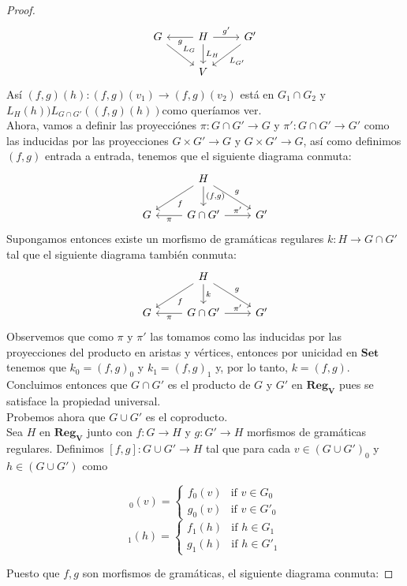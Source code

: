 \documentclass[../main.tex]{subfiles}
\begin{document}
\begin{proof}
 	\[
 	\begin{tikzcd}
 		G \arrow{rd}{L_G} & H \arrow{r}{g'} \arrow{l}{g} \arrow{d}{L_H}  & G' \arrow{ld}{L_{G'}} \\
 		& V 
 	\end{tikzcd}
 	\]
 	Así $(f,g)(h):(f,g)(v_1) \to (f,g)(v_2)$ está en $G_1 \cap G_2$ y $L_H(h))L_{G\cap G'}((f,g)(h))$como queríamos ver. \\
 	Ahora, vamos a definir las proyecciónes $\pi : G\cap G' \to G$ y $\pi' : G\cap G' \to G'$ como las inducidas por las proyecciones $G \times G' \to G$ y $G \times G' \to G$, así como definimos $(f,g)$ entrada a entrada, tenemos que el siguiente diagrama conmuta: 
 	 \[
 	\begin{tikzcd} 		
 		& H \arrow{d}{(f,g)} \arrow{ld}{f} \arrow{rd}{g} & \\
 		G  & G\cap G' \arrow{l}{\pi} \arrow{r}{\pi'} & G'
 	\end{tikzcd}
 	\]
 	Supongamos entonces existe un morfismo de gramáticas regulares $k: H \to G\cap G'$ tal que el siguiente diagrama también conmuta: 
 	 \[
	\begin{tikzcd} 		
		& H \arrow{d}{k} \arrow{ld}{f} \arrow{rd}{g} & \\
		G  & G\cap G' \arrow{l}{\pi} \arrow{r}{\pi'} & G'
	\end{tikzcd}
	\]
	Observemos que como $\pi$ y $\pi'$ las tomamos como las inducidas por las proyecciones del producto en aristas y vértices, entonces por unicidad en $\mathbf{Set}$ tenemos que $k_0=(f,g)_0$ y $k_1=(f,g)_1$ y, por lo tanto, $k=(f,g)$. \\
	Concluimos entonces que $G \cap G'$ es el producto de $G$ y $G'$ en $\mathbf{Reg_V}$ pues se satisface la propiedad universal. \\
	Probemos ahora que $G\cup G'$ es el coproducto. \\
	Sea $H$ en $\mathbf{Reg_V}$ junto con $f:G \to H$ y $g:G' \to H$ morfismos de gramáticas regulares. Definimos $[f,g]:G\cup G' \to H$ tal que para cada $v \in (G\cup G')_0$ y $h \in (G\cup G')$ como
	\begin{multicols}{2}
		\begin{equation*}
			[f,g]_0(v)=
			\begin{cases}
				f_0(v) & \text{if } v \in G_0\\
				g_0(v) & \text{if } v \in G'_0
			\end{cases}
		\end{equation*}
		\begin{equation*}
			[f,g]_1(h)=
			\begin{cases}
				f_1(h) & \text{if } h \in G_1\\
				g_1(h) & \text{if } h \in G'_1
			\end{cases}
		\end{equation*}
	\end{multicols}
	Puesto que $f,g$ son morfismos de gramáticas, el siguiente diagrama conmuta:
	

\end{proof}
\end{document}
